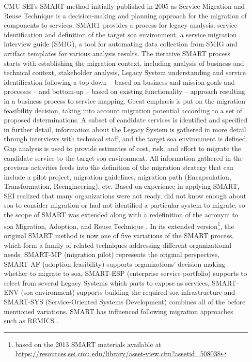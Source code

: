 CMU SEI's SMART method \autocite{Lewis2008SMART,Lewis2005SMART} initially published in 2005 as Service Migration and Reuse Technique is a decision-making and planning approach for the migration of  components to services.
SMART provides a process for legacy analysis, service identification and definition of the target \gls{soa} environment, a service migration interview guide (SMIG), a tool for automating data collection from SMIG and \gls{artifact} templates for various analysis results.
The iterative SMART process starts with establishing the migration context, including analysis of business and technical context, stakeholder analysis, \gls{Legacy System} understanding and service identification following a top-down -- based on business and mission goals and processes -- and bottom-up -- based on existing  functionality -- approach resulting in a business process to service mapping.
Great emphasis is put on the migration feasibility decision, taking into account migration potential according to a set of proposed determinations.
A subset of candidate services is identified and specified in further detail, information about the \gls{Legacy System} is gathered in more detail through interviews with technical staff, and the target \gls{soa} environment is defined.
Gap analysis is used to provide estimates of cost, risk, and effort to migrate the candidate service to the target \gls{soa} environment.
All information gathered in the previous activities feeds into the definition of the migration strategy that can include a pilot project, migration guidelines, migration path (\gls{Encapsulation}, \gls{Transformation}, \gls{Reengineering}), etc.
Based on experience in applying SMART, SEI realized that many organizations were not ready, did not know enough about \gls{soa} to consider migration or had not identified a particular system to migrate, so the scope of SMART was extended along with a redefinition of the acronym to \gls{soa} Migration, Adoption, and Reuse Technique \autocite{Lewis2010SMART}.
In its extended version\footnote{based on the 2013 SMART materials available at \url{https://resources.sei.cmu.edu/library/asset-view.cfm?assetid=508038}}, the original SMART method is now one of five variations of the SMART process, which form a family of related techniques addressing different organizational needs.
SMART-MP (migration pilot) represents the original perspective, SMART-AF (adoption feasibility) supports organizations' decision making whether to migrate to \gls{soa}, SMART-ESP (enterprise service portfolio) supports to select from several \glspl{Legacy System} which parts to expose as services, SMART-ENV (\gls{soa} environment) supports building the required \gls{soa} infrastructure and SMART-SYS (Service-Oriented Systems Development) combines all of the before mentioned variations.
SMART has influenced following migration approaches such as REMICS \autocite{REMICS2013Handbook,Mohagheghi2011REMICS}.

